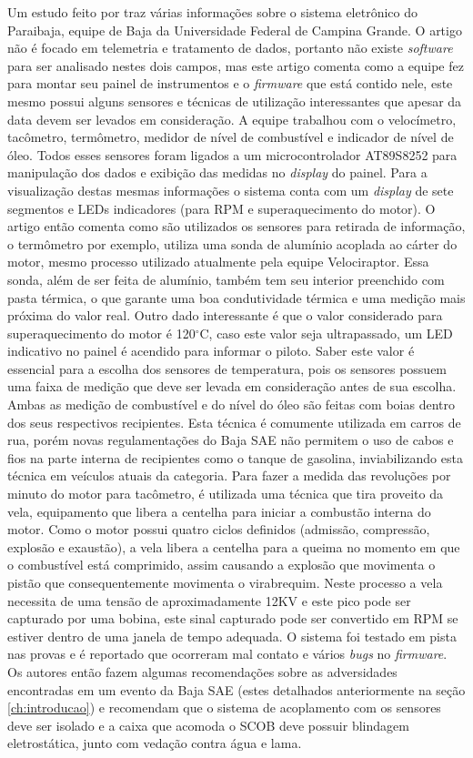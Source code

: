 Um estudo feito por  traz várias informações sobre o sistema eletrônico do Paraibaja, equipe de Baja da Universidade Federal de Campina Grande. O artigo não é focado em telemetria e tratamento de dados, portanto não existe \textit{software} para ser analisado nestes dois campos, mas este artigo comenta como a equipe fez para montar seu painel de instrumentos e o \textit{firmware} que está contido nele, este mesmo possui alguns sensores e técnicas de utilização interessantes que apesar da data devem ser levados em consideração. A equipe trabalhou com o velocímetro, tacômetro, termômetro, medidor de nível de combustível e indicador de nível de óleo. Todos esses sensores foram ligados a um microcontrolador AT89S8252 para manipulação dos dados e exibição das medidas no \textit{display} do painel. Para a visualização destas mesmas informações o sistema conta com um \textit{display} de sete segmentos e LEDs indicadores (para RPM e superaquecimento do motor). O artigo então comenta como são utilizados os sensores para retirada de informação, o termômetro por exemplo, utiliza uma sonda de alumínio acoplada ao cárter do motor, mesmo processo utilizado atualmente pela equipe Velociraptor. Essa sonda, além de ser feita de alumínio, também tem seu interior preenchido com pasta térmica, o que garante uma boa condutividade térmica e uma medição mais próxima do valor real. Outro dado interessante é que o valor considerado para superaquecimento do motor é 120$^\circ$C, caso este valor seja ultrapassado, um LED indicativo no painel é acendido para informar o piloto. Saber este valor é essencial para a escolha dos sensores de temperatura, pois os sensores possuem uma faixa de medição que deve ser levada em consideração antes de sua escolha. Ambas as medição de combustível e do nível do óleo são feitas com boias dentro dos seus respectivos recipientes. Esta técnica é comumente utilizada em carros de rua, porém novas regulamentações do Baja SAE \cite{regulamentobajasae} não permitem o uso de cabos e fios na parte interna de recipientes como o tanque de gasolina, inviabilizando esta técnica em veículos atuais da categoria. Para fazer a medida das revoluções por minuto do motor para tacômetro, é utilizada uma técnica que tira proveito da vela, equipamento que libera a centelha para iniciar a combustão interna do motor. Como o motor possui quatro ciclos definidos (admissão, compressão, explosão e exaustão), a vela libera a centelha para a queima no momento em que o combustível está comprimido, assim causando a explosão que movimenta o pistão que consequentemente movimenta o virabrequim. Neste processo a vela necessita de uma tensão de aproximadamente 12KV e este pico pode ser capturado por uma bobina, este sinal capturado pode ser convertido em RPM se estiver dentro de uma janela de tempo adequada. O sistema foi testado em pista nas provas e é reportado que ocorreram mal contato e vários \textit{bugs} no \textit{firmware}. Os autores então fazem algumas recomendações sobre as adversidades encontradas em um evento da Baja SAE (estes detalhados anteriormente na seção \ref{ch:introducao}) e recomendam que o sistema de acoplamento com os sensores deve ser isolado e a caixa que acomoda o SCOB deve possuir blindagem eletrostática, junto com vedação contra água e lama.

